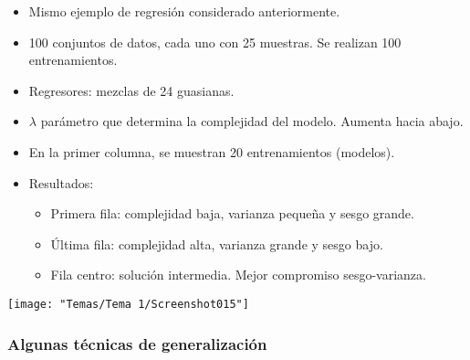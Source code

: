 \begin{minipage}{0.5\textwidth}
	\begin{itemize}
		\item Mismo ejemplo de regresión considerado anteriormente.
		\item 100 conjuntos de datos, cada uno con 25 muestras. Se realizan 100 entrenamientos.
		\item Regresores: mezclas de 24 guasianas.
		\item $\lambda$ parámetro que determina la complejidad del modelo. Aumenta hacia abajo.
		\item En la primer columna, se muestran 20 entrenamientos (modelos).
		\item Resultados:
		\begin{itemize}
			\item Primera fila: complejidad baja, varianza pequeña y sesgo grande.
			\item Última fila: complejidad alta, varianza grande y sesgo bajo.
			\item Fila centro: solución intermedia. Mejor compromiso sesgo-varianza.
		\end{itemize}
	\end{itemize}
\end{minipage}\qquad\begin{minipage}{0.45\textwidth}
\begin{center}
	\texttt{[image: "Temas/Tema 1/Screenshot015"]}
\end{center}
\end{minipage}
\subsubsection{Algunas técnicas de generalización}
